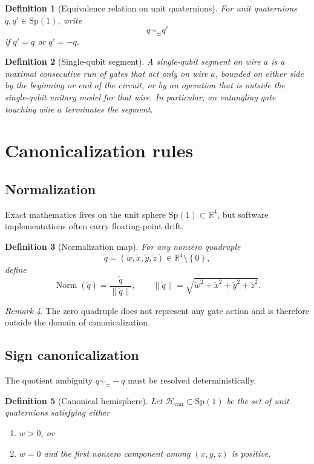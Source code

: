 \documentclass[11pt]{article}
\newtheorem{definition}{Definition}[section]
\theoremstyle{remark}
\newtheorem{remark}[definition]{Remark}
\newcommand{\R}{\mathbb{R}}
\newcommand{\norm}[1]{\left\lVert #1 \right\rVert}
\newcommand{\set}[1]{\left\{ #1 \right\}}
\newcommand{\normalize}{\operatorname{Norm}}
\begin{document}
\begin{definition}[Equivalence relation on unit quaternions]
For unit quaternions $q,q'\in\mathrm{Sp}(1)$, write
\[
q\sim_{\pm} q'
\]
if $q'=q$ or $q'=-q$.
\end{definition}

\begin{definition}[Single-qubit segment]
A \emph{single-qubit segment} on wire $a$ is a maximal consecutive run of gates
that act only on wire $a$, bounded on either side by the beginning or end of
the circuit, or by an operation that is outside the single-qubit unitary model
for that wire. In particular, an entangling gate touching wire $a$ terminates
the segment.
\end{definition}

\section{Canonicalization rules}

\subsection{Normalization}

Exact mathematics lives on the unit sphere $\mathrm{Sp}(1)\subset\R^4$, but
software implementations often carry floating-point drift.

\begin{definition}[Normalization map]
For any nonzero quadruple
\[
\tilde q=(\tilde w,\tilde x,\tilde y,\tilde z)\in\R^4\setminus\set{0},
\]
define
\[
\normalize(\tilde q)=\frac{\tilde q}{\norm{\tilde q}},
\qquad
\norm{\tilde q}=\sqrt{\tilde w^2+\tilde x^2+\tilde y^2+\tilde z^2}.
\]
\end{definition}

\begin{remark}
The zero quadruple does not represent any gate action and is therefore outside
the domain of canonicalization.
\end{remark}

\subsection{Sign canonicalization}

The quotient ambiguity $q\sim_{\pm}-q$ must be resolved deterministically.

\begin{definition}[Canonical hemisphere]
Let $\mathcal{H}_{\mathrm{can}}\subset \mathrm{Sp}(1)$ be the set of unit
quaternions satisfying either
\begin{enumerate}[label=(\alph*), leftmargin=1.5em]
\item $w>0$, or
\item $w=0$ and the first nonzero component among $(x,y,z)$ is positive.
\end{enumerate}
\end{definition}
\end{document}
